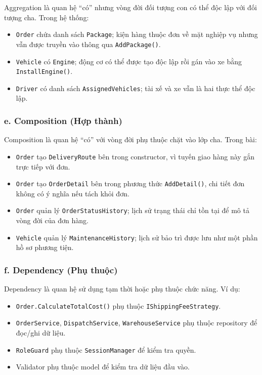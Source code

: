 \documentclass[12pt,a4paper]{article}
\begin{document}
Aggregation là quan hệ ``có'' nhưng vòng đời đối tượng con có thể độc lập với đối tượng cha. Trong hệ thống:

\begin{itemize}[leftmargin=1.2cm]
    \item \texttt{Order} chứa danh sách \texttt{Package}; kiện hàng thuộc đơn về mặt nghiệp vụ nhưng vẫn được truyền vào thông qua \texttt{AddPackage()}.
    \item \texttt{Vehicle} có \texttt{Engine}; động cơ có thể được tạo độc lập rồi gán vào xe bằng \texttt{InstallEngine()}.
    \item \texttt{Driver} có danh sách \texttt{AssignedVehicles}; tài xế và xe vẫn là hai thực thể độc lập.
\end{itemize}

\subsubsection*{e. Composition (Hợp thành)}

Composition là quan hệ ``có'' với vòng đời phụ thuộc chặt vào lớp cha. Trong bài:

\begin{itemize}[leftmargin=1.2cm]
    \item \texttt{Order} tạo \texttt{DeliveryRoute} bên trong constructor, vì tuyến giao hàng này gắn trực tiếp với đơn.
    \item \texttt{Order} tạo \texttt{OrderDetail} bên trong phương thức \texttt{AddDetail()}, chi tiết đơn không có ý nghĩa nếu tách khỏi đơn.
    \item \texttt{Order} quản lý \texttt{OrderStatusHistory}; lịch sử trạng thái chỉ tồn tại để mô tả vòng đời của đơn hàng.
    \item \texttt{Vehicle} quản lý \texttt{MaintenanceHistory}; lịch sử bảo trì được lưu như một phần hồ sơ phương tiện.
\end{itemize}

\subsubsection*{f. Dependency (Phụ thuộc)}

Dependency là quan hệ sử dụng tạm thời hoặc phụ thuộc chức năng. Ví dụ:

\begin{itemize}[leftmargin=1.2cm]
    \item \texttt{Order.CalculateTotalCost()} phụ thuộc \texttt{IShippingFeeStrategy}.
    \item \texttt{OrderService}, \texttt{DispatchService}, \texttt{WarehouseService} phụ thuộc repository để đọc/ghi dữ liệu.
    \item \texttt{RoleGuard} phụ thuộc \texttt{SessionManager} để kiểm tra quyền.
    \item Validator phụ thuộc model để kiểm tra dữ liệu đầu vào.
\end{itemize}
\end{document}
